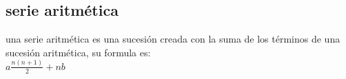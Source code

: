 \subsection{serie aritmética}
una serie aritmética es una sucesión creada con la suma de los términos de una sucesión aritmética, su formula es:
\\$a\frac{n(n+1)}{2}+nb$ 
